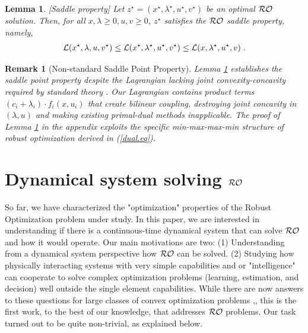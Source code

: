 \documentclass[journal,twoside,web]{ieeecolor}
\newcommand{\rev}[1]{\textcolor{revisionblue}{#1}}
\newtheorem{lemma}{Lemma}
\newtheorem{remark}{Remark}
\begin{document}
\begin{lemma} \label{saddle.lem} [Saddle property]
Let $z^\star=(x^\star,\lambda^\star,u^\star,v^\star)$ be an optimal ${\cal RO}$ solution. Then, for all $x,\lambda\geq 0,u,v\geq 0$\;, $z^\star$ satisfies the ${\cal RO}$ saddle property, namely,
\begin{align} \label{saddle}
{\cal L}(x^\star,\lambda,u,v^\star)\leq {\cal L}(x^\star,\lambda^\star,u^\star,v^\star)\leq {\cal L}(x,\lambda^\star,u^\star,v)\;.
\end{align}
\end{lemma}

\begin{remark}[\rev{Non-standard Saddle Point Property}]
\rev{Lemma \ref{saddle.lem} establishes the saddle point property despite the Lagrangian lacking joint convexity-concavity required by standard theory \cite{boyd2004,rockafellar1970}. Our Lagrangian contains product terms $(c_i+\lambda_i) \cdot f_i(x,u_i)$ that create bilinear coupling, destroying joint concavity in $(\lambda,u)$ and making existing primal-dual methods \cite{arrow1958,feijer2010} inapplicable. The proof of Lemma \ref{saddle.lem} in the appendix exploits the specific min-max-max-min structure of robust optimization derived in (\ref{dual.eq}).}
\end{remark}

\section{Dynamical system solving ${\cal RO}$} \label{section_pddynamics}

So far,  we have characterized the "optimization" properties of the Robust Optimization problem under study.  In this paper, we are interested in understanding if there is a continuous-time dynamical system that can solve ${\cal RO}$ and how it would operate. Our main motivations are two: (1) Understanding from a dynamical system perspective how ${\cal RO}$ can be solved. (2) Studying how physically interacting systems with very simple capabilities and or "intelligence" can cooperate to solve complex optimization problems (learning, estimation, and decision) well outside the single element capabilities. While there are now answers to these questions for large classes of convex optimization problems \cite{feijer2010},\cite{wang2011}, this is the first work, to the best of our knowledge, that addresses ${\cal RO}$ problems. Our task turned out to be quite non-trivial, as explained below.
\end{document}
